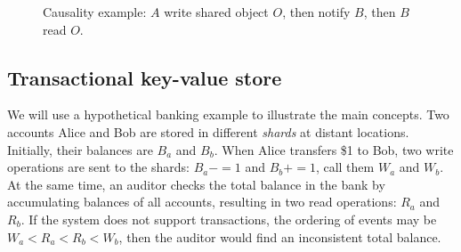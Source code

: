 \begin{figure}[t]
\centering
    \hspace{0.03\textwidth}
	\caption{Causality example: $A$ write shared object $O$, then notify $B$, then $B$ read $O$.}
	\label{fig:causality}
	\vspace{-1.5em}
\end{figure}





\subsection{Transactional key-value store}
\label{subsec:transactional-kvs}

We will use a hypothetical banking example to illustrate the main concepts. Two accounts Alice and Bob are stored in different \textit{shards} at distant locations. Initially, their balances are $B_a$ and $B_b$. When Alice transfers \$1 to Bob, two write operations are sent to the shards: $B_a -= 1$ and $B_b += 1$, call them $W_a$ and $W_b$. At the same time, an auditor checks the total balance in the bank by accumulating balances of all accounts, resulting in two read operations: $R_a$ and $R_b$. If the system does not support transactions, the ordering of events may be $W_a < R_a < R_b < W_b$, then the auditor would find an inconsistent total balance.

